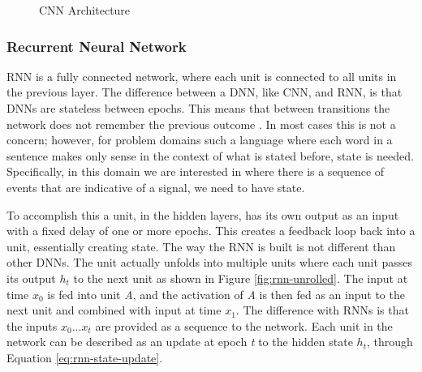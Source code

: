 \documentclass[11pt]{article}
\begin{document}
\begin{figure}[!ht]
	\centering
	\caption{CNN Architecture \cite{A19}}
	\label{fig:cnn-architecture}
\end{figure}

\subsubsection{Recurrent Neural Network} \label{sec:rnn}

RNN is a fully connected network, where each unit is connected to all units in the previous layer. The difference between a DNN, like CNN, and RNN, is that DNNs are stateless between epochs. This means that between transitions the network does not remember the previous outcome \cite{Lipton2015ALearning}. In most cases this is not a concern; however, for problem domains such a language where each word in a sentence makes only sense in the context of what is stated before, state is needed. Specifically, in this domain we are interested in where there is a sequence of events that are indicative of a signal, we need to have state.

To accomplish this a unit, in the hidden layers, has its own output as an input with a fixed delay of one or more epochs. This creates a feedback loop back into a unit, essentially creating state. The way the RNN is built is not different than other DNNs. The unit actually unfolds into multiple units where each unit passes its output \textit{\(h_t\)} to the next unit as shown in Figure \ref{fig:rnn-unrolled}. The input at time \textit{\(x_0\)} is fed into unit \textit{A}, and the activation of \textit{A} is then fed as an input to the next unit and combined with input at time \textit{\(x_1\)}. The difference with RNNs is that the inputs \textit{\(x_0 ... x_t\)} are provided as a sequence to the network. Each unit in the network can be described as an update at epoch \textit{t} to the hidden state \textit{\(h_t\)}, through Equation \ref{eq:rnn-state-update}.
\end{document}
